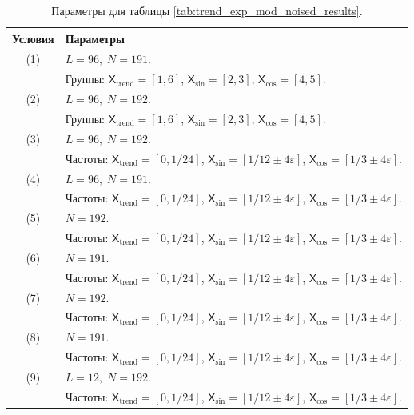 \documentclass[12pt, specialist, subf
]{disser}
\theoremstyle{definition}
\newcommand{\TS}{\mathsf{X}}
\begin{document}
\begin{table}[H]
  \caption{Параметры для таблицы \ref{tab:trend_exp_mod_noised_results}.}
  \centering
  \label{tab:trend_exp_mod_noised_parameters}
  \begin{tabularx}{\textwidth}{|c|X|}
    \hline
    \textbf{Условия} & \textbf{Параметры} \\
    \hline
    (1)  & \(L = 96,\; N = 191\). \\
         & Группы: \(\TS_{\text{trend}} = [1,6]\), \(\TS_{\sin} = [2,3]\), \(\TS_{\cos} = [4,5]\). \\
    \hline
    (2)  & \(L = 96,\; N = 192\). \\
         & Группы: \(\TS_{\text{trend}} = [1,6]\), \(\TS_{\sin} = [2,3]\), \(\TS_{\cos} = [4,5]\). \\
    \hline
    (3)  & \(L = 96,\; N = 192\). \\
         & Частоты: \(\TS_{\text{trend}} = [0,1/24]\), \(\TS_{\sin} = [1/12\pm4\varepsilon]\), \(\TS_{\cos} = [1/3\pm4\varepsilon]\). \\
    \hline
    (4)  & \(L = 96,\; N = 191\). \\
         & Частоты: \(\TS_{\text{trend}} = [0,1/24]\), \(\TS_{\sin} = [1/12\pm4\varepsilon]\), \(\TS_{\cos} = [1/3\pm4\varepsilon]\). \\
    \hline
    (5)  & \(N = 192\). \\
         & Частоты: \(\TS_{\text{trend}} = [0,1/24]\), \(\TS_{\sin} = [1/12\pm4\varepsilon]\), \(\TS_{\cos} = [1/3\pm4\varepsilon]\). \\
    \hline
    (6)  & \(N = 191\). \\
         & Частоты: \(\TS_{\text{trend}} = [0,1/24]\), \(\TS_{\sin} = [1/12\pm4\varepsilon]\), \(\TS_{\cos} = [1/3\pm4\varepsilon]\). \\
    \hline
    (7)  & \(N = 192\). \\
         & Частоты: \(\TS_{\text{trend}} = [0,1/24]\), \(\TS_{\sin} = [1/12\pm4\varepsilon]\), \(\TS_{\cos} = [1/3\pm4\varepsilon]\). \\
    \hline
    (8)  & \(N = 191\). \\
	& Частоты: \(\TS_{\text{trend}} = [0,1/24]\), \(\TS_{\sin} = [1/12\pm4\varepsilon]\), \(\TS_{\cos} = [1/3\pm4\varepsilon]\). \\
    \hline
    (9)  & \(L = 12,\; N = 192\). \\
         & Частоты: \(\TS_{\text{trend}} = [0,1/24]\), \(\TS_{\sin} = [1/12\pm4\varepsilon]\), \(\TS_{\cos} = [1/3\pm4\varepsilon]\). \\

\end{tabularx}
\end{table}
\end{document}
